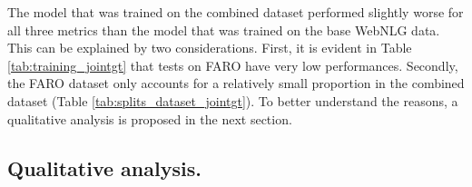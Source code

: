 \documentclass[
hf, %
]{ceurart}
\begin{document}
The model that was trained on the combined dataset performed slightly worse for all three metrics than the model that was trained on the base WebNLG data. This can be explained by two considerations. First, it is evident in Table \ref{tab:training_jointgt} that tests on FARO have very low performances. Secondly, the FARO dataset only accounts for a relatively small proportion in the combined dataset (Table \ref{tab:splits_dataset_jointgt}). To better understand the reasons, a qualitative analysis is proposed in the next section.

\subsection{Qualitative analysis.}
\begin{table}
\caption{Sample of the FARO test-set and the generated output of the base- and combined model}
\label{tab:combined_base_farotest-set}


\end{table}
\end{document}
